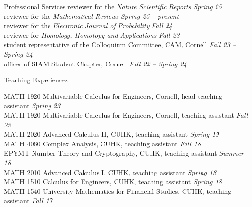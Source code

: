 \documentclass{resume} %
\begin{document}
\begin{rSection}{Professional Services}
reviewer for the \emph{Nature Scientific Reports} \hfill {\em Spring 25}\\
reviewer for the \emph{Mathematical Reviews} \hfill {\em Spring 25 -- present}\\
reviewer for the \emph{Electronic Journal of Probability} \hfill {\em Fall 24}\\
reviewer for \emph{Homology, Homotopy and Applications} \hfill {\em Fall 23}\\
student representative of the Colloquium Committee, CAM, Cornell \hfill {\em Fall 23 -- Spring 24} \\
officer of SIAM Student Chapter, Cornell \hfill {\em Fall 22 -- Spring 24}
\end{rSection}

\begin{rSection}{Teaching Experiences}

MATH 1920 
Multivariable Calculus for Engineers, Cornell, head teaching assistant \hfill {\em Spring 23}\\
MATH 1920 
Multivariable Calculus for Engineers, Cornell, teaching assistant \hfill {\em Fall 22}\\
MATH 2020 Advanced Calculus II, CUHK, teaching assistant \hfill {\em Spring 19}\\
MATH 4060 Complex Analysis, CUHK, teaching assistant \hfill {\em Fall 18}\\
EPYMT Number Theory and Cryptography, CUHK, teaching assistant \hfill {\em Summer 18}\\
MATH 2010 Advanced Calculus I, CUHK, teaching assistant \hfill {\em Spring 18}\\
MATH 1510 Calculus for Engineers, CUHK, teaching assistant \hfill {\em Spring 18}\\
MATH 1540 University Mathematics for Financial Studies, CUHK, teaching assistant \hfill {\em Fall 17}
\end{rSection}
\end{document}
